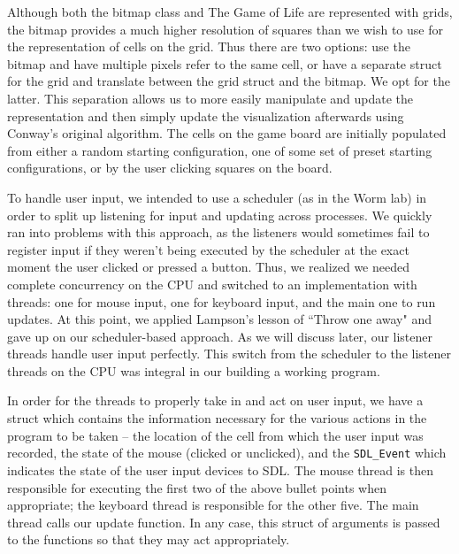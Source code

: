 \documentclass[onecolumn,12pt]{IEEEtran}
\begin{document}
  Although both the bitmap class and The Game of Life are represented with grids,
  the bitmap provides a much higher resolution of squares than we wish to use
  for the representation of cells on the grid. Thus there are two options: use
  the bitmap and have multiple pixels refer to the same cell, or have a separate
  struct for the grid and translate between the grid struct and the bitmap. We
  opt for the latter. This separation allows us to more easily manipulate and
  update the representation and then simply update the visualization afterwards
  using Conway's original algorithm. The cells on the game board are initially 
  populated from either a random starting configuration, one of some set of
  preset starting configurations, or by the user clicking squares on the board. 

  To handle user input, we intended to use a scheduler (as in the Worm lab) in
  order to split up listening for input and updating across processes. We quickly
  ran into problems with this approach, as the listeners would sometimes fail to
  register input if they weren't being executed by the scheduler at the exact
  moment the user clicked or pressed a button. Thus, we realized we needed
  complete concurrency on the CPU and switched to an implementation with threads:
  one for mouse input, one for keyboard input, and the main one to run updates.
  At this point, we applied Lampson's lesson of ``Throw one away" and gave up on
  our scheduler-based approach. As we will discuss later, our listener threads 
  handle user input perfectly. This switch from the scheduler to the listener
  threads on the CPU was integral in our building a working program.

  In order for the threads to properly take in and act on user input, we have a
  struct which contains the information necessary for the various actions in the
  program to be taken -- the location of the cell from which the user input was
  recorded, the state of the mouse (clicked or unclicked), and the
  \texttt{SDL\_Event} which indicates the state of the user input devices to SDL.
  The mouse thread is then responsible for executing the first two of the above
  bullet points when appropriate; the keyboard thread is responsible for the
  other five. The main thread calls our update function. In any case, this struct
  of arguments is passed to the functions so that they may act appropriately. 
\end{document}
